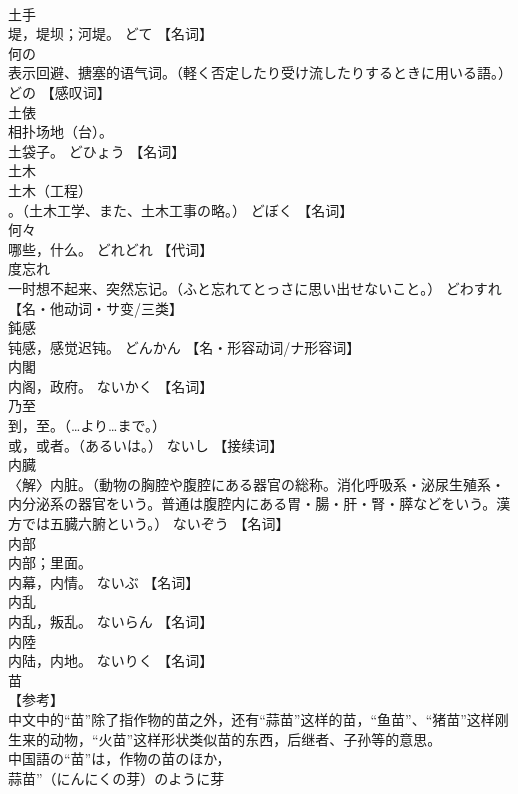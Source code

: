 \documentclass[8pt]{extreport}
\begin{document}
\begin{CJK}{UTF8}{min}
\\	土手	
\\	堤，堤坝；河堤。	どて		【名词】
\\	何の	
\\	表示回避、搪塞的语气词。（軽く否定したり受け流したりするときに用いる語。）	どの		【感叹词】
\\	土俵	
\\	相扑场地（台）。 
\\	土袋子。	どひょう		【名词】
\\	土木	
\\	土木（工程）
\\	。（土木工学、また、土木工事の略。）	どぼく		【名词】
\\	何々	
\\	哪些，什么。	どれどれ		【代词】
\\	度忘れ	
\\	一时想不起来、突然忘记。（ふと忘れてとっさに思い出せないこと。）	どわすれ		【名・他动词・サ变/三类】
\\	鈍感	
\\	钝感，感觉迟钝。	どんかん		【名・形容动词/ナ形容词】
\\	内閣	
\\	内阁，政府。	ないかく		【名词】
\\	乃至	
\\	到，至。（…より…まで。） 
\\	或，或者。（あるいは。）	ないし		【接续词】
\\	内臓	
\\	〈解〉内脏。（動物の胸腔や腹腔にある器官の総称。消化呼吸系・泌尿生殖系・内分泌系の器官をいう。普通は腹腔内にある胃・腸・肝・腎・膵などをいう。漢方では五臓六腑という。）	ないぞう		【名词】
\\	内部	
\\	内部；里面。 
\\	内幕，内情。	ないぶ		【名词】
\\	内乱	
\\	内乱，叛乱。	ないらん		【名词】
\\	内陸	
\\	内陆，内地。	ないりく		【名词】
\\	苗	
\\	【参考】 
\\	中文中的“苗”除了指作物的苗之外，还有“蒜苗”这样的苗，“鱼苗”、“猪苗”这样刚生来的动物，“火苗”这样形状类似苗的东西，后继者、子孙等的意思。 
\\	中国語の“苗”は，作物の苗のほか，
\\	蒜苗”（にんにくの芽）のように芽 

\end{CJK}
\end{document}

